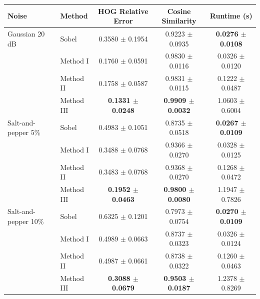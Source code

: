 \begin{tabular}{llccc}
\toprule
Noise & Method & HOG Relative Error & Cosine Similarity & Runtime (s) \\
\midrule
Gaussian 20 dB & Sobel & 0.3580 $\pm$ 0.1954 & 0.9223 $\pm$ 0.0935 & \textbf{0.0276 $\pm$ 0.0108} \\
 & Method I & 0.1760 $\pm$ 0.0591 & 0.9830 $\pm$ 0.0116 & 0.0326 $\pm$ 0.0120 \\
 & Method II & 0.1758 $\pm$ 0.0587 & 0.9831 $\pm$ 0.0115 & 0.1222 $\pm$ 0.0487 \\
 & Method III & \textbf{0.1331 $\pm$ 0.0248} & \textbf{0.9909 $\pm$ 0.0032} & 1.0603 $\pm$ 0.6004 \\
\midrule
Salt-and-pepper 5\% & Sobel & 0.4983 $\pm$ 0.1051 & 0.8735 $\pm$ 0.0518 & \textbf{0.0267 $\pm$ 0.0109} \\
 & Method I & 0.3488 $\pm$ 0.0768 & 0.9366 $\pm$ 0.0270 & 0.0328 $\pm$ 0.0125 \\
 & Method II & 0.3483 $\pm$ 0.0768 & 0.9368 $\pm$ 0.0270 & 0.1268 $\pm$ 0.0472 \\
 & Method III & \textbf{0.1952 $\pm$ 0.0463} & \textbf{0.9800 $\pm$ 0.0080} & 1.1947 $\pm$ 0.7826 \\
\midrule
Salt-and-pepper 10\% & Sobel & 0.6325 $\pm$ 0.1201 & 0.7973 $\pm$ 0.0754 & \textbf{0.0270 $\pm$ 0.0109} \\
 & Method I & 0.4989 $\pm$ 0.0663 & 0.8737 $\pm$ 0.0323 & 0.0326 $\pm$ 0.0124 \\
 & Method II & 0.4987 $\pm$ 0.0661 & 0.8738 $\pm$ 0.0322 & 0.1260 $\pm$ 0.0463 \\
 & Method III & \textbf{0.3088 $\pm$ 0.0679} & \textbf{0.9503 $\pm$ 0.0187} & 1.2378 $\pm$ 0.8269 \\
\bottomrule
\end{tabular}
